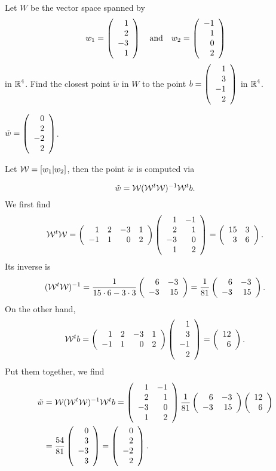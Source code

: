 \documentclass{ximera}
\begin{document}
\begin{exercise} \label{YZ_9.1.8}
Let $W$ be the vector space spanned by 
\[
w_1 =\Matrix{1 \\2\\-3\\1} \AND w_2 = \Matrix{-1\\1\\0\\2}
\]
 in $\R^4$.  Find the closest point $\tilde{w}$ in $W$ to the point $b=\Matrix{1\\3\\-1\\2}$ in $\R^4$.
\begin{solution}

\ans $\tilde{w}=\Matrix{0\\2\\-2\\2}$.

\soln
Let $\WW=[w_1|w_2]$, then the point $\tilde{w}$ is computed via

\[
\tilde{w}=\WW(\WW^t\WW)^{-1}\WW^tb.
\]
We first find
\[
\WW^t\WW=\Matrix{1&2&-3&1\\-1&1&0&2}\Matrix{1&-1\\2&1\\-3&0\\1&2}=\Matrix{15 &3 \\3 &6}.
\]
Its inverse is 
\[
(\WW^t\WW)^{-1}=\frac{1}{15\cdot 6-3\cdot 3}\Matrix{6 &-3\\-3 &15}=\frac{1}{81}\Matrix{6 &-3\\-3 &15}.
\]
On the other hand,
\[
\WW^tb=\Matrix{1&2&-3&1\\-1&1&0&2}\Matrix{1\\3\\-1\\2}=\Matrix{12\\6}.
\]
Put them together, we find 
\begin{align*}
   \tilde{w}&=\WW(\WW^t\WW)^{-1}\WW^tb=\Matrix{1&-1\\2&1\\-3&0\\1&2}\frac{1}{81}\Matrix{6 &-3\\-3 &15}\Matrix{12\\6}\\
   &=\frac{54}{81}\Matrix{0\\3\\-3\\3}=\Matrix{0\\2\\-2\\2}. 
\end{align*}
\end{solution}
\end{exercise}
\end{document}
